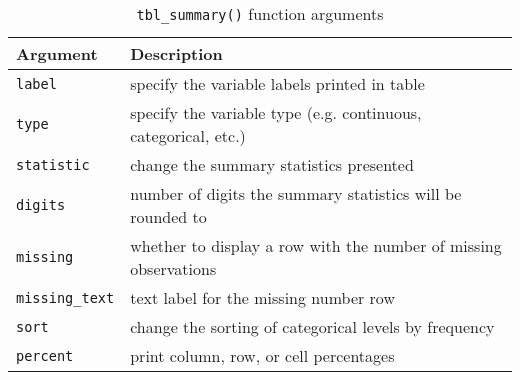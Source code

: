 \captionsetup[table]{labelformat=empty,skip=1pt}
\begin{longtable}{ll}
\caption{\label{tab:}\texttt{tbl_summary()} function arguments}\\
\toprule
Argument & Description \\ 
\midrule
\texttt{label} & specify the variable labels printed in table \\ 
\texttt{type} & specify the variable type (e.g. continuous, categorical, etc.) \\ 
\texttt{statistic} & change the summary statistics presented \\ 
\texttt{digits} & number of digits the summary statistics will be rounded to \\ 
\texttt{missing} & whether to display a row with the number of missing observations \\ 
\texttt{missing\_text} & text label for the missing number row \\ 
\texttt{sort} & change the sorting of categorical levels by frequency \\ 
\texttt{percent} & print column, row, or cell percentages \\ 
\bottomrule
\end{longtable}

